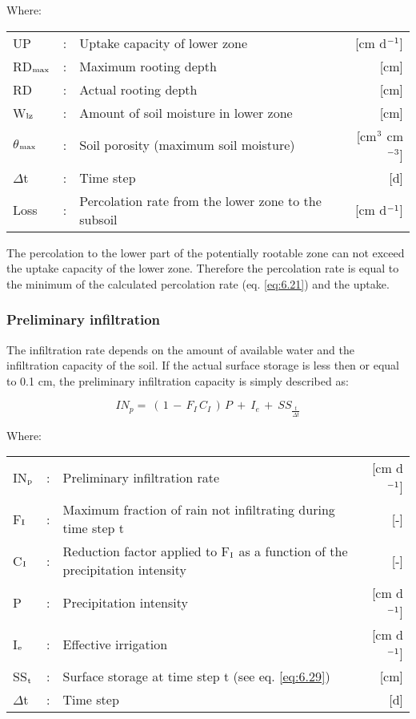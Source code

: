 Where:\\[5pt]
\begin{tabularx}{\textwidth}{llXr}
UP &:& Uptake capacity of lower zone  & [cm d$^{{\rm -1}}$]\\
RD$_{{\rm max}}$ &:& Maximum rooting depth  & [cm]\\
RD &:& Actual rooting depth  & [cm]\\
W$_{{\rm lz}}$ &:& Amount of soil moisture in lower zone  & [cm]\\
$\theta$$_{{\rm max}}$ &:& Soil porosity (maximum soil moisture)  & [cm$^{{\rm 3}}$ cm$^{{\rm -3}}$]\\
$\Delta$t &:& Time step  & [d]\\
Loss &:& Percolation rate from the lower zone to the subsoil   & [cm d$^{{\rm -1}}$]\\
\end{tabularx}

The percolation to the lower part of the potentially rootable zone can not exceed the
uptake capacity of the lower zone. Therefore the percolation rate is equal to the minimum
of the calculated percolation rate (eq. \ref{eq:6.21}) and the uptake.

\subsubsection{Preliminary infiltration}
The infiltration rate depends on the amount of available water and the infiltration capacity
of the soil. If the actual surface storage is less then or equal to 0.1 cm, the preliminary
infiltration capacity is simply described as:

\begin{equation}
\label{eq:6.26}
IN_{p} =~ (\, 1\, -\, F _{I} \, C _{I} \, )\, P~+~ I _{e~} +~ SS _{\frac{t}{ \Delta t}} 
\end{equation}

Where:\\[5pt]
\begin{tabularx}{\textwidth}{llXr}
IN$_{{\rm p}}$ &:& Preliminary infiltration rate  & [cm d$^{{\rm -1}}$]\\
F$_{{\rm I}}$ &:& Maximum fraction of rain not infiltrating during time step t  & [-]\\
C$_{{\rm I}}$ &:& Reduction factor applied to F$_{{\rm I}}$ as a function of the 
   precipitation intensity  & [-]\\
P &:& Precipitation intensity  & [cm d$^{{\rm -1}}$]\\
I$_{{\rm e}}$ &:& Effective irrigation  & [cm d$^{{\rm -1}}$]\\
SS$_{{\rm t}}$ &:& Surface storage at time step t (see eq. \ref{eq:6.29})  & [cm]\\
$\Delta$t &:& Time step  & [d]\\
\end{tabularx}

